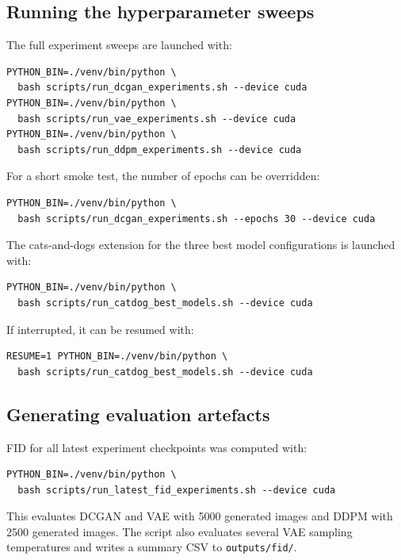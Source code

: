 \documentclass[11pt,a4paper]{article}
\begin{document}
\subsection{Running the hyperparameter sweeps}

The full experiment sweeps are launched with:
\begin{verbatim}
PYTHON_BIN=./venv/bin/python \
  bash scripts/run_dcgan_experiments.sh --device cuda
PYTHON_BIN=./venv/bin/python \
  bash scripts/run_vae_experiments.sh --device cuda
PYTHON_BIN=./venv/bin/python \
  bash scripts/run_ddpm_experiments.sh --device cuda
\end{verbatim}

For a short smoke test, the number of epochs can be overridden:
\begin{verbatim}
PYTHON_BIN=./venv/bin/python \
  bash scripts/run_dcgan_experiments.sh --epochs 30 --device cuda
\end{verbatim}

The cats-and-dogs extension for the three best model configurations is launched with:
\begin{verbatim}
PYTHON_BIN=./venv/bin/python \
  bash scripts/run_catdog_best_models.sh --device cuda
\end{verbatim}
If interrupted, it can be resumed with:
\begin{verbatim}
RESUME=1 PYTHON_BIN=./venv/bin/python \
  bash scripts/run_catdog_best_models.sh --device cuda
\end{verbatim}

\subsection{Generating evaluation artefacts}

FID for all latest experiment checkpoints was computed with:
\begin{verbatim}
PYTHON_BIN=./venv/bin/python \
  bash scripts/run_latest_fid_experiments.sh --device cuda
\end{verbatim}
This evaluates DCGAN and VAE with 5000 generated images and DDPM with 2500 generated images.
The script also evaluates several VAE sampling temperatures and writes a summary CSV to \texttt{outputs/fid/}.
\end{document}
